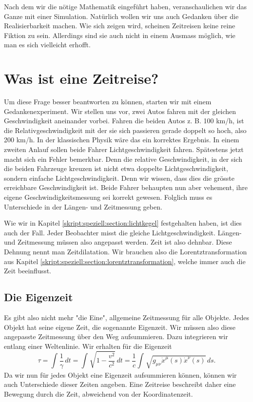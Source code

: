 \begin{refsection}
Nach dem wir die nötige Mathematik eingeführt haben, veranschaulichen wir das Ganze mit einer Simulation. Natürlich wollen wir uns auch Gedanken über die Realisierbarkeit machen. Wie sich zeigen wird, scheinen Zeitreisen keine reine Fiktion zu sein. Allerdings sind sie auch nicht in einem Ausmass möglich, wie man es sich vielleicht erhofft.

\section{Was ist eine Zeitreise?}
Um diese Frage besser beantworten zu können, starten wir mit einem Gedankenexperiment. Wir stellen uns vor, zwei Autos fahren mit der gleichen Geschwindigkeit aneinander vorbei. Fahren die beiden Autos z. B. 100 km/h, ist die Relativgeschwindigkeit mit der sie sich passieren gerade doppelt so hoch, also 200 km/h. In der klassischen Physik wäre das ein korrektes Ergebnis. In einem zweiten Anlauf sollen beide Fahrer Lichtgeschwindigkeit fahren. Spätestens jetzt macht sich ein Fehler bemerkbar. Denn die relative Geschwindigkeit, in der sich die beiden Fahrzeuge kreuzen ist nicht etwa doppelte Lichtgeschwindigkeit, sondern einfache Lichtgeschwindigkeit. Denn wir wissen, dass dies die grösste erreichbare Geschwindigkeit ist.
Beide Fahrer behaupten nun aber vehement, ihre eigene Geschwindigkeitsmessung sei korrekt gewesen. Folglich muss es Unterschiede in der Längen- und Zeitmessung geben.

Wie wir in Kapitel \ref{skript:speziell:section:lichtkegel} festgehalten haben, ist dies auch der Fall. Jeder Beobachter misst die gleiche Lichtgeschwindigkeit. Längen- und Zeitmessung müssen also angepasst werden. Zeit ist also dehnbar. Diese Dehnung nennt man Zeitdilatation. Wir brauchen also die Lorentztransformation aus Kapitel \ref{skript:speziell:section:lorentztransformation}, welche immer auch die Zeit beeinflusst.

\subsection{Die Eigenzeit}
Es gibt also nicht mehr "die Eine", allgemeine Zeitmessung für alle Objekte. Jedes Objekt hat seine eigene Zeit, die sogenannte Eigenzeit. Wir müssen also diese angepasste Zeitmessung über den Weg aufsummieren.
Dazu integrieren wir entlang einer Weltenlinie. Wir erhalten für die Eigenzeit
\begin{equation}\label{Eigenzeit}
\tau
=
\int_{}^{}\frac{1}{\gamma}\,dt=\int_{}^{}\sqrt{1-\frac{v^2}{c^2}}\,dt
=
\frac{1}{c}\int_{}^{}\sqrt{g_{\mu\nu}\dot{x}^{\mu}(s)\dot{x}^{\nu}(s)}\,ds.
\end{equation}
Da wir nun für jedes Objekt eine Eigenzeit aufsummieren können, können wir auch Unterschiede dieser Zeiten angeben.
Eine Zeitreise beschreibt daher eine Bewegung durch die Zeit, abweichend von der Koordinatenzeit.


\end{refsection}
